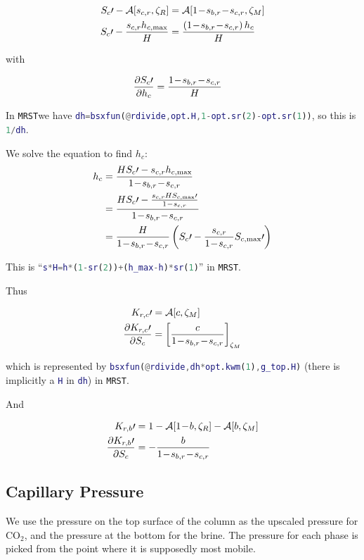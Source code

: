 \documentclass[12pt]{scrartcl}
\newcommand{\mth}[1]{\ensuremath{#1}\xspace}
\newcommand{\COO}{\mth{\mathrm{CO}_2}}
\newcommand{\MRST}{{\tt MRST}}
\newcommand{\aleft}{\mathopen{}\mathclose\bgroup\left}  %
\newcommand{\aright}{\aftergroup\egroup\right}          %
\newcommand{\binop}[3]{#1\mkern1mu{#2}\mkern1mu #3}     %
\newcommand{\dual}[1]{\binop{1}{-}{#1}}                 %
\newcommand{\ddual}[2]{\binop{\binop{1}{-}{#1}}{-}{#2}} %
\newcommand{\at}[2]{\left[ #1 \right]_{#2}}             %
\newcommand{\der}[2]{\frac{\partial{#1}}{\partial{#2}}}       %
\newcommand{\Hei}{H}        %
\newcommand{\hei}{h}        %
\newcommand{\Sat}{S}        %
\newcommand{\sat}{s}        %
\newcommand{\sr}[1]{\sat_{#1,r}}    %
\newcommand{\Rlp}[1]{K_{r,#1}}  %
\newcommand{\Lev}{\zeta}    %
\newcommand{\Res}{R}        %
\newcommand{\Mob}{M}        %
\newcommand{\nap}{c}        %
\newcommand{\wet}{b}        %
\newcommand{\avg}[2]{\mathcal{A}\aleft[#1, #2\aright]}  %
\newcommand{\krnwr}{c}      %
\newcommand{\krwnr}{b}      %
\newcommand{\Satn}{\Sat_\nap}
\newcommand{\Satnmax}{\Sat_{\nap,\max}} %
\newcommand{\snr}{\sr{\nap}}    %
\newcommand{\swr}{\sr{\wet}}    %
\newcommand{\LevM}{\Lev_\Mob}
\newcommand{\LevR}{\Lev_\Res}
\newcommand{\hnap}{\hei_\nap}           %
\newcommand{\hnmax}{\hei_{\nap,\max}}   %
\newcommand{\Rlpn}{\Rlp{\nap}}  %
\newcommand{\Rlpw}{\Rlp{\wet}}  %
\begin{document}
\begin{align}
\Satn \prime - \avg{ \snr }{ \LevR } &= \avg{ \ddual{ \swr }{ \snr } }{ \LevM } \\
\Satn \prime - \frac{ \snr \hnmax }{ \Hei } &= \frac{ \left( \ddual{ \swr }{ \snr } \right) \hnap }{ \Hei }
\end{align}

with

\begin{align}
\der{ \Satn \prime }{ \hnap } &= \frac{ \ddual{ \swr }{ \snr } }{ \Hei }
\end{align}

In \MRST we have \lstinline[language=Matlab]!dh=bsxfun(@rdivide,opt.H,1-opt.sr(2)-opt.sr(1))!, so this is \lstinline[language=Matlab]!1/dh!.

We solve the equation to find \( \hnap \):
\begin{align}
\hnap &= \frac{ \Hei \Satn \prime - \snr \hnmax }{ \ddual{ \swr }{ \snr } } \\
&= \frac{ \Hei \Satn \prime - \frac{ \snr \Hei \Satnmax \prime }{ \dual{ \snr } } }{ \ddual{ \swr }{ \snr } } \\
&= \frac{ \Hei }{ \ddual{ \swr }{ \snr } } \left( \Satn \prime - \frac{ \snr }{ \dual{ \snr } } \Satnmax \prime \right)
\end{align}

This is ``\lstinline[language=Matlab]!s*H=h*(1-sr(2))+(h_max-h)*sr(1)!'' in \MRST.

Thus

\begin{align}
\Rlpn \prime &= \avg{ \krnwr }{ \LevM } \\
\der{ \Rlpn \prime }{ \Satn } &= \at{ \frac{ \krnwr }{ \ddual{ \swr }{ \snr } } }{ \LevM }
\end{align}

which is represented by \lstinline[language=Matlab]!bsxfun(@rdivide,dh*opt.kwm(1),g_top.H)! (there is implicitly a \lstinline[language=Matlab]!H! in \lstinline[language=Matlab]!dh!) in \MRST.

And

\begin{align}
\Rlpw \prime &= 1 - \avg{ \dual{ \krwnr } }{ \LevR } - \avg{ \krwnr }{ \LevM } \\
\der{ \Rlpw \prime }{ \Satn } &= - \frac{ \krwnr }{ \ddual{ \swr }{ \snr } }
\end{align}

\subsection{Capillary Pressure}
We use the pressure on the top surface of the column as the upscaled pressure for \COO, and the pressure at the bottom for the brine. The pressure for each phase is picked from the point where it is supposedly most mobile.
\end{document}

